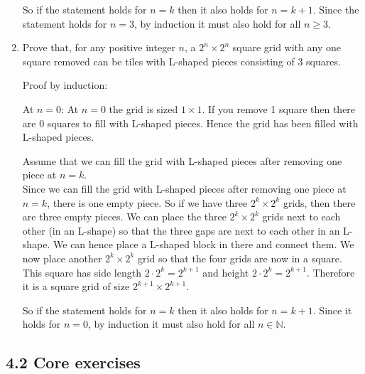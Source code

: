 \documentclass[10pt,\jkfside,a4paper]{article}
\begin{document}
\begin{enumerate}
So if the statement holds for $n = k$ then it also holds for $n = k + 1$. Since the statement holds for 
$n = 3$, by induction it must also hold for all $n \geq 3$.

\item Prove that, for any positive integer $n$, a $2^n \times 2^n$ square grid with any one square removed 
can be tiles with L-shaped pieces consisting of 3 squares.

Proof by induction:

At $n = 0$:
At $n = 0$ the grid is sized $1 \times 1$. If you remove 1 square then there are 0 squares to fill with 
L-shaped pieces. Hence the grid has been filled with L-shaped pieces.

Assume that we can fill the grid with L-shaped pieces after removing one piece at $n = k$.\\
Since we can fill the grid with L-shaped pieces after removing one piece at $n = k$, there is one empty 
piece. So if we have three $2^k \times 2^k$ grids, then there are three empty pieces. We can place the 
three $2^k \times 2^k$ grids next to each other (in an L-shape) so that the three gaps are next to each 
other in an L-shape. We can hence place a L-shaped block in there and connect them. We now place another 
$2^k \times 2^k$ grid so that the four grids are now in a square. This square has side length 
$2\cdot 2^k = 2^{k + 1}$ and height $2\cdot 2^k = 2^{k + 1}$. Therefore it is a square grid of size 
$2^{k + 1} \times 2^{k + 1}$.

So if the statement holds for $n = k$ then it also holds for $n = k + 1$. Since it holds for $n = 0$, by 
induction it must also hold for all $n \in \mathbb{N}$.

\end{enumerate}

\subsection*{4.2 Core exercises}
\end{document}
